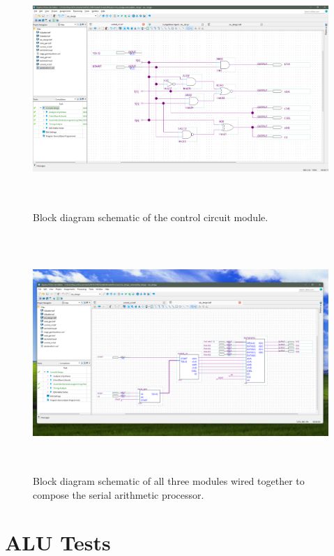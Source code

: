 \documentclass[11pt,a4paper,english]{article}
\begin{document}
  \begin{figure}[h!]
    \centering
    \includegraphics[height=90mm]{./ss/controlCircuitBDF.png}
    \caption{Block diagram schematic of the control circuit module.}
  \end{figure}
  \begin{figure}[h!]
    \centering
    \includegraphics[height=90mm]{./ss/ALU_DESIGN.png}
    \caption{Block diagram schematic of all three modules wired together to compose the serial arithmetic processor.}
  \end{figure}
\pagebreak

  \section*{ALU Tests}
\end{document}

